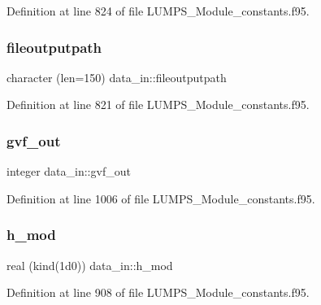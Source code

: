 Definition at line 824 of file L\+U\+M\+P\+S\+\_\+\+Module\+\_\+constants.\+f95.

\mbox{\label{namespacedata__in_a62ca2dcc9ca96142df62a94056f96391}} 
\subsubsection{\texorpdfstring{fileoutputpath}{fileoutputpath}}
{\footnotesize\ttfamily character (len=150) data\+\_\+in\+::fileoutputpath}



Definition at line 821 of file L\+U\+M\+P\+S\+\_\+\+Module\+\_\+constants.\+f95.

\mbox{\label{namespacedata__in_a6e0cf4ed5e44b4ec04403466ed583117}} 
\subsubsection{\texorpdfstring{gvf\+\_\+out}{gvf\_out}}
{\footnotesize\ttfamily integer data\+\_\+in\+::gvf\+\_\+out}



Definition at line 1006 of file L\+U\+M\+P\+S\+\_\+\+Module\+\_\+constants.\+f95.

\mbox{\label{namespacedata__in_aaa77ae828595f5b1e1bec4237020dfbc}} 
\subsubsection{\texorpdfstring{h\+\_\+mod}{h\_mod}}
{\footnotesize\ttfamily real (kind(1d0)) data\+\_\+in\+::h\+\_\+mod}



Definition at line 908 of file L\+U\+M\+P\+S\+\_\+\+Module\+\_\+constants.\+f95.

\mbox{\label{namespacedata__in_a1d9097970f09654fb90ab93ffea8d0a6}} 

